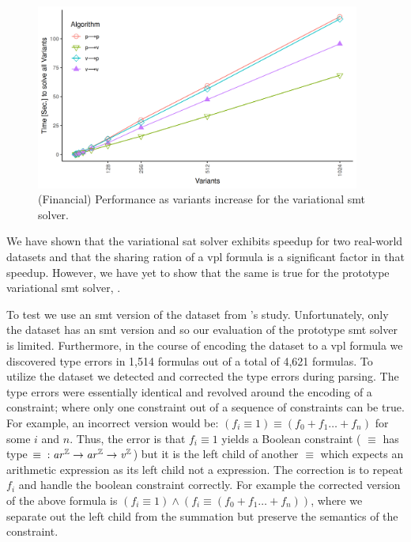~\label{section:case-studies:vsmt}
%
\begin{figure}
  \includegraphics[width=0.95\textwidth]{Plots/RQ1_Fin_Smt}
  \caption{(Financial) Performance as variants increase for the variational
    \ac{smt} solver.}%
  \label{res:rq1:vsmt}
\end{figure}
%
We have shown that the variational \ac{sat} solver exhibits speedup for two
real-world datasets and that the sharing ration of a \ac{vpl} formula is a
significant factor in that speedup. However, we have yet to show that the same
is true for the prototype variational \ac{smt} solver, \vsmt{}.

To test \vsmt{} we use an \ac{smt} version of the \fin{} dataset from \nieke{}'s
study. Unfortunately, only the \fin{} dataset has an \ac{smt} version and so our
evaluation of the prototype \ac{smt} solver is limited. Furthermore, in the
course of encoding the dataset to a \ac{vpl} formula we discovered type errors
in 1,514 formulas out of a total of 4,621 formulas. To utilize the dataset we
detected and corrected the type errors during parsing. The type errors were
essentially identical and revolved around the encoding of a 
constraint; where only one constraint out of a sequence of constraints can be
true. For example, an incorrect version would be: $(f_{i} \equiv{} 1) \equiv{}
(f_{0} + f_{1} \ldots{} + f_{n})$ for some $i$ and $n$. Thus, the error is that
$f_{i} \equiv 1$ yields a Boolean constraint (\ie{} $\equiv$ has type $\equiv{}
: \mathit{ar^{\mathbb{Z}}}{} \rightarrow \mathit{ar^{\mathbb{Z}}}{} \rightarrow{} \mathit{v^{\mathbb{Z}}}{}$) but it is the left child of
another $\equiv$ which expects an arithmetic expression as its left child not a
\eIL{} expression. The correction is to repeat $f_{i}$ and handle the boolean
constraint correctly. For example the corrected version of the above formula is
$(f_{i} \equiv{} 1) \wedge{} (f_{i} \equiv{} (f_{0} + f_{1} \ldots{} + f_{n}))$,
where we separate out the left child from the summation but preserve the
semantics of the  constraint.
